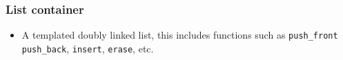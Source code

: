 \begin{frame}
    \frametitle{List container}

    
    \begin{itemize}
        \item A templated doubly linked list, this includes functions such as \texttt{push\_front} \texttt{push\_back}, \texttt{insert}, \texttt{erase}, etc.
    \end{itemize}

\end{frame}